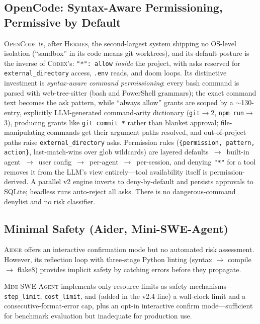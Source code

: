 \documentclass[11pt,a4paper]{article}
\newcommand{\cdx}{\textsc{Codex}\xspace}
\newcommand{\adr}{\textsc{Aider}\xspace}
\newcommand{\mswe}{\textsc{Mini-SWE-Agent}\xspace}
\newcommand{\hrm}{\textsc{Hermes}\xspace}
\newcommand{\ocd}{\textsc{OpenCode}\xspace}
\begin{document}
\subsection{OpenCode: Syntax-Aware Permissioning, Permissive by Default}

\ocd{} is, after \hrm{}, the second-largest system shipping no OS-level isolation (``sandbox'' in its code means git worktrees), and its default posture is the inverse of \cdx{}'s: \texttt{"*": allow} \emph{inside} the project, with asks reserved for \texttt{external\_directory} access, \texttt{.env} reads, and doom loops.
Its distinctive investment is \emph{syntax-aware command permissioning}: every bash command is parsed with web-tree-sitter (bash and PowerShell grammars); the exact command text becomes the ask pattern, while ``always allow'' grants are scoped by a $\sim$130-entry, explicitly LLM-generated command-arity dictionary (\texttt{git}$\to$2, \texttt{npm run}$\to$3), producing grants like \texttt{git commit *} rather than blanket approval; file-manipulating commands get their argument paths resolved, and out-of-project paths raise \texttt{external\_directory} asks.
Permission rules (\texttt{\{permission, pattern, action\}}, last-match-wins over glob wildcards) are layered defaults~$\to$~built-in agent~$\to$~user config~$\to$~per-agent~$\to$~per-session, and denying \texttt{"*"} for a tool removes it from the LLM's view entirely---tool availability itself is permission-derived.
A parallel v2 engine inverts to deny-by-default and persists approvals to SQLite; headless runs auto-reject all asks.
There is no dangerous-command denylist and no risk classifier.

\subsection{Minimal Safety (Aider, Mini-SWE-Agent)}

\adr{} offers an interactive confirmation mode but no automated risk assessment.
However, its reflection loop with three-stage Python linting (syntax $\to$ compile $\to$ flake8) provides implicit safety by catching errors before they propagate.

\mswe{} implements only resource limits as safety mechanisms---\texttt{step\_limit}, \texttt{cost\_limit}, and (added in the v2.4 line) a wall-clock limit and a consecutive-format-error cap, plus an opt-in interactive confirm mode---sufficient for benchmark evaluation but inadequate for production use.

\end{document}
